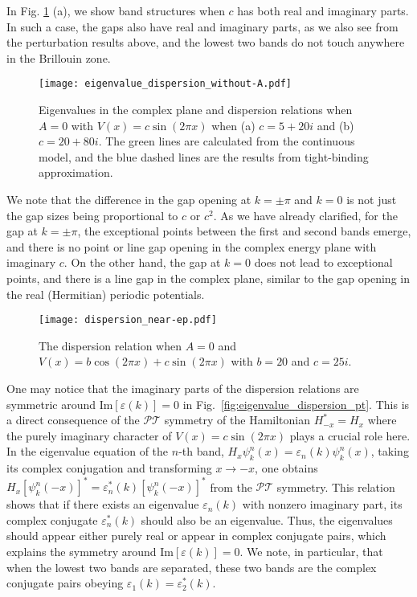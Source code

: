 \documentclass[prb,superscriptaddress,floatfix,twocolumn,showpacs]{revtex4-2}
\begin{document}
In Fig. \ref{fig:eigenvalue_dispersion_without-A} (a), we show band structures when $c$ has both real and imaginary parts. 
In such a case, the gaps also have real and imaginary parts, as we also see from the perturbation results above, and the lowest two bands do not touch anywhere in the Brillouin zone.

\begin{figure}
    \centering
    \texttt{[image: eigenvalue\_dispersion\_without-A.pdf]}
    \caption{Eigenvalues in the complex plane and dispersion relations when $A=0$ with $V(x) = c \sin (2\pi x)$ when (a) $c=5+20i$ and (b) $c=20+80i$. 
    The green lines are calculated from the continuous model, and the blue dashed lines are the results from tight-binding approximation.}
    \label{fig:eigenvalue_dispersion_without-A}
\end{figure}

We note that the difference in the gap opening at $k = \pm \pi$ and $k = 0$ is not just the gap sizes being proportional to $c$ or $c^2$. 
As we have already clarified, for the gap at $k = \pm\pi$, the exceptional points between the first and second bands emerge, and there is no point or line gap opening in the complex energy plane with imaginary $c$. 
On the other hand, the gap at $k = 0$ does not lead to exceptional points, and there is a line gap in the complex plane, similar to the gap opening in the real (Hermitian) periodic potentials.

\begin{figure}[tbp]
    \centering
    \texttt{[image: dispersion\_near-ep.pdf]}
    \caption{The dispersion relation when $A=0$ and $V(x) = b\cos (2\pi x) + c \sin (2\pi x)$ with $b = 20$ and $c=25i$.}
    \label{fig:dispersion_near-ep}
\end{figure}

One may notice that the imaginary parts of the dispersion relations are symmetric around $\mathrm{Im}[\varepsilon (k)] = 0$ in Fig.~\ref{fig:eigenvalue_dispersion_pt}. 
This is a direct consequence of the $\mathcal{PT}$ symmetry of the Hamiltonian $H_{-x}^\ast=H_x$ where the purely imaginary character of $V(x) = c \sin (2\pi x)$ plays a crucial role here. 
In the eigenvalue equation of the $n$-th band, $H_x \psi_k^n (x) = \varepsilon_n (k) \psi_k^n (x)$, taking its complex conjugation and transforming $x \to -x$, one obtains $H_x [\psi_k^n (-x)]^* = \varepsilon_n^\ast (k) [\psi_k^n (-x)]^*$ from the $\mathcal{PT}$ symmetry. 
This relation shows that if there exists an eigenvalue $\varepsilon_n (k)$ with nonzero imaginary part, its complex conjugate $\varepsilon_n^\ast (k)$ should also be an eigenvalue. 
Thus, the eigenvalues should appear either purely real or appear in complex conjugate pairs, which explains the symmetry around $\mathrm{Im}[\varepsilon (k)] = 0$. 
We note, in particular, that when the lowest two bands are separated, these two bands are the complex conjugate pairs obeying $\varepsilon_1 (k) = \varepsilon_2^\ast (k)$.
\end{document}
